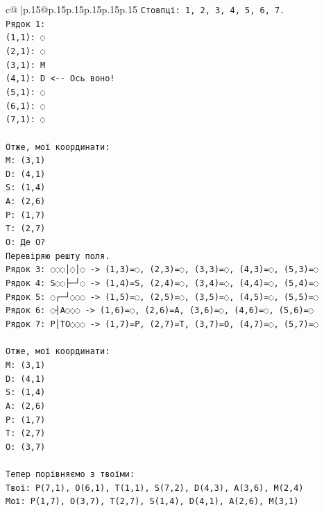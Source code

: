 \documentclass{article}
\begin{document}
{\begin{supertabular}{c@{$\;$}|p{.15\linewidth}@{}p{.15\linewidth}p{.15\linewidth}p{.15\linewidth}p{.15\linewidth}p{.15\linewidth}}
{{{\texttt{Стовпці: 1, 2, 3, 4, 5, 6, 7.} \\
\texttt{Рядок 1:} \\
\texttt{(1,1): ◌} \\
\texttt{(2,1): ◌} \\
\texttt{(3,1): M} \\
\texttt{(4,1): D  <{-}{-} Ось воно!} \\
\texttt{(5,1): ◌} \\
\texttt{(6,1): ◌} \\
\texttt{(7,1): ◌} \\
\\ 
\texttt{Отже, мої координати:} \\
\texttt{M: (3,1)} \\
\texttt{D: (4,1)} \\
\texttt{S: (1,4)} \\
\texttt{A: (2,6)} \\
\texttt{P: (1,7)} \\
\texttt{T: (2,7)} \\
\texttt{O: Де O?} \\
\texttt{Перевіряю решту поля.} \\
\texttt{Рядок 3: ◌◌◌│◌│◌ {-}> (1,3)=◌, (2,3)=◌, (3,3)=◌, (4,3)=◌, (5,3)=◌} \\
\texttt{Рядок 4: S◌◌├─┘◌ {-}> (1,4)=S, (2,4)=◌, (3,4)=◌, (4,4)=◌, (5,4)=◌} \\
\texttt{Рядок 5: ◌┌─┘◌◌◌ {-}> (1,5)=◌, (2,5)=◌, (3,5)=◌, (4,5)=◌, (5,5)=◌} \\
\texttt{Рядок 6: ◌┤A◌◌◌ {-}> (1,6)=◌, (2,6)=A, (3,6)=◌, (4,6)=◌, (5,6)=◌} \\
\texttt{Рядок 7: P│TO◌◌◌ {-}> (1,7)=P, (2,7)=T, (3,7)=O, (4,7)=◌, (5,7)=◌} \\
\\ 
\texttt{Отже, мої координати:} \\
\texttt{M: (3,1)} \\
\texttt{D: (4,1)} \\
\texttt{S: (1,4)} \\
\texttt{A: (2,6)} \\
\texttt{P: (1,7)} \\
\texttt{T: (2,7)} \\
\texttt{O: (3,7)} \\
\\ 
\texttt{Тепер порівняємо з твоїми:} \\
\texttt{Твої: P(7,1), O(6,1), T(1,1), S(7,2), D(4,3), A(3,6), M(2,4)} \\
\texttt{Мої: P(1,7), O(3,7), T(2,7), S(1,4), D(4,1), A(2,6), M(3,1)} \\
}}}
\end{supertabular}}
\end{document}
